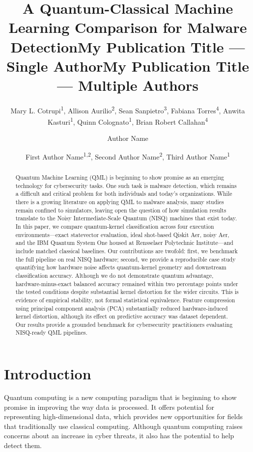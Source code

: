 \documentclass[letterpaper]{article} %
\title{A Quantum-Classical Machine Learning Comparison for Malware Detection}
\author{
    Mary L. Cotrupi\textsuperscript{\rm 1}, Allison Aurilio\textsuperscript{\rm 2}, Sean Sanpietro\textsuperscript{\rm 3}, Fabiana Torres\textsuperscript{\rm 4}, Anwita Kasturi\textsuperscript{\rm 1}, Quinn Colognato\textsuperscript{\rm 1}, Brian Robert Callahan\textsuperscript{\rm 4}
}
\title{My Publication Title --- Single Author}
\author {
    Author Name
}
\title{My Publication Title --- Multiple Authors}
\author {
    First Author Name\textsuperscript{\rm 1,\rm 2},
    Second Author Name\textsuperscript{\rm 2},
    Third Author Name\textsuperscript{\rm 1}
}
\begin{document}
\maketitle

\begin{abstract}
Quantum Machine Learning (QML) is beginning to show promise as an emerging technology for cybersecurity tasks. One such task is malware detection, which remains a difficult and critical problem for both individuals and today's organizations. While there is a growing literature on applying QML to malware analysis, many studies remain confined to simulators, leaving open the question of how simulation results translate to the Noisy Intermediate-Scale Quantum (NISQ) machines that exist today. In this paper, we compare quantum-kernel classification across four execution environments---exact statevector evaluation, ideal shot-based Qiskit Aer, noisy Aer, and the IBM Quantum System One housed at Rensselaer Polytechnic Institute---and include matched classical baselines. Our contributions are twofold: first, we benchmark the full pipeline on real NISQ hardware; second, we provide a reproducible case study quantifying how hardware noise affects quantum-kernel geometry and downstream classification accuracy. Although we do not demonstrate quantum advantage, hardware-minus-exact balanced accuracy remained within two percentage points under the tested conditions despite substantial kernel distortion for the wider circuits. This is evidence of empirical stability, not formal statistical equivalence. Feature compression using principal component analysis (PCA) substantially reduced hardware-induced kernel distortion, although its effect on predictive accuracy was dataset dependent. Our results provide a grounded benchmark for cybersecurity practitioners evaluating NISQ-ready QML pipelines.
\end{abstract}

\section{Introduction}

Quantum computing is a new computing paradigm that is beginning to show promise in improving the way data is processed. It offers potential for representing high-dimensional data, which provides new opportunities for fields that traditionally use classical computing. Although quantum computing raises concerns about an increase in cyber threats, it also has the potential to help detect them.
\end{document}
